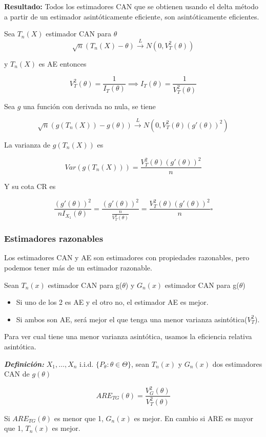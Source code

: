 \textbf{Resultado: }Todos los estimadores CAN que se obtienen usando el delta método a partir de un estimador asintóticamente eficiente,
son asintóticamente eficientes.


\begin{proofs}
    Sea $T_n(X)$ estimador CAN para $\theta$
    \[
        \sqrt{n}(T_n(X)-\theta) \overset{L}{\to}N(0,V^2_T(\theta))
    \]

    y $T_n(X)$ es AE entonces

    \[
        V^2_T(\theta) = \frac{1}{I_T(\theta)} \implies I_T(\theta)=\frac{1}{V^2_T(\theta)}
    \]

    Sea $g$ una función con derivada no nula, se tiene

    \[
        \sqrt{n}(g(T_n(X))-g(\theta)) \overset{L}{\to}N(0,V^2_T(\theta)(g'(\theta))^2)
    \]

    La varianza de $g(T_n(X))$ es

    \[
        Var(g(T_n(X)))=\frac{V^2_T(\theta)(g'(\theta))^2}{n}
    \]

    Y su cota CR es

    \[
        \frac{(g'(\theta))^2}{nI_{X_1}(\theta)}=\frac{(g'(\theta))^2}{\frac{n}{V^2_T(\theta)}}=\frac{V^2_T(\theta)(g'(\theta))^2}{n}\square
    \]
\end{proofs}
\newpage
\subsubsection{Estimadores razonables}

Los estimadores CAN y AE son estimadores con propiedades razonables, pero podemos tener más de un estimador razonable.

Sean $T_n(x)$ estimador CAN para g($\theta$) y $G_n(x)$ estimador CAN para g($\theta$)
\begin{itemize}
    \item Si uno de los 2 es AE y el otro no, el estimador AE es mejor.
    \item Si ambos son AE, será mejor el que tenga una menor varianza asintótica($V_T^2$).
\end{itemize}

Para ver cual tiene una menor varianza asintótica, usamos la eficiencia relativa asintótica.

\textbf{\textit{Definición: }} $X_1,\dots,X_n$ i.i.d. $\{ P_\theta: \theta \in \Theta \}$, sean $T_n(x)$
y $G_n(x)$ dos estimadores CAN de $g(\theta)$

\[
    ARE_{TG}(\theta)=\frac{V_G^2(\theta)}{V_T^2(\theta)}
\]

Si $ARE_{TG}(\theta)$ es menor que 1, $G_n(x)$ es mejor. En cambio si ARE es mayor que 1, $T_n(x)$ es mejor.

\newpage
